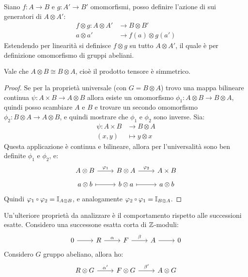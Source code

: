 \begin{proposition}
  Siano $ f \colon A \to B $ e $ g \colon A' \to B' $ omomorfismi, posso definire l'azione di
  sui generatori di $ A \otimes A' $:
  \begin{align*}
    f \otimes g \colon A \otimes A' & \to B \otimes B' \\
    a \otimes a' & \to f(a) \otimes g(a')
  \end{align*}
  Estendendo per linearità si definisce $ f \otimes g $ su tutto $ A \otimes A' $, il quale è
  per definizione omomorfismo di gruppi abeliani.
\end{proposition}

\begin{proposition}
  Vale che $ A \otimes B \cong B \otimes A $, cioè il prodotto tensore è simmetrico.
\end{proposition}
\begin{proof}
  Se per la proprietà universale (con $ G = B \otimes A $) trovo una mappa bilineare continua
  $ \psi \colon A \times B \to A \otimes B $ allora esiste un omomorfismo
  $ \phi_1 \colon A \otimes B \to B \otimes A $, quindi posso scambiare $ A $ e
  $ B $ e trovare un secondo omomorfismo
  $ \phi_2 \colon B \otimes A \to A \otimes B $, e quindi mostrare che $ \phi_1 $ e $ \phi_2 $ sono inverse.
  Sia:
  \begin{align*}
    \psi \colon A \times B & \to B \otimes A \\
    (x,y) & \mapsto y \otimes x
  \end{align*}
  Questa applicazione è continua e bilineare, allora per l'universalità sono ben
  definite $ \phi_1 $ e $ \phi_2 $, e:
  \[
    \begin{tikzcd}[nodes = {row sep=5pt}]
      A \otimes B \rar{\phi_1} & B \otimes A \rar{\phi_2} & A \times B \\
      a \otimes b \arrow[mapsto]{r} & b \otimes a \arrow[mapsto]{r} & a \otimes b
    \end{tikzcd}
  \]
  Quindi $ \phi_1 \circ \phi_2 = \Id{A \otimes B} $, e analogamente  $ \phi_2 \circ \phi_1 = \Id{B \otimes A} $.
\end{proof}
\eproof
Un'ulteriore proprietà da analizzare è il comportamento rispetto alle successioni
esatte. Considero una successone esatta corta di $ \mathbb{Z} $-moduli:
\[
  \begin{tikzcd}
    0 \rar{} & R \rar{\alpha} & F \rar{\beta} & A \rar & 0
  \end{tikzcd}
\]
Considero $ G $ gruppo abeliano, allora ho:
\[
  \begin{tikzcd}
    R \otimes G \rar{\alpha'} & F \otimes G \rar{\beta'} & A \otimes G
  \end{tikzcd}
\]
